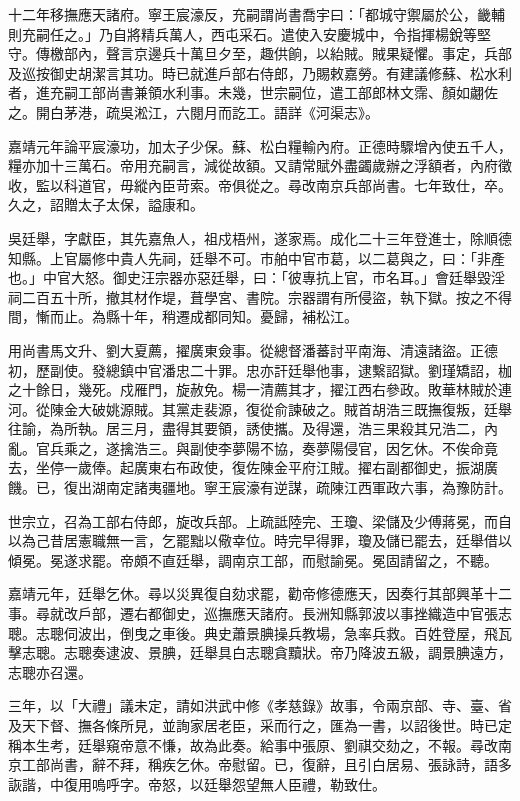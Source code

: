 \begin{pinyinscope}
十二年移撫應天諸府。寧王宸濠反，充嗣謂尚書喬宇曰：「都城守禦屬於公，畿輔則充嗣任之。」乃自將精兵萬人，西屯采石。遣使入安慶城中，令指揮楊銳等堅守。傳檄部內，聲言京邊兵十萬旦夕至，趣供餉，以紿賊。賊果疑懼。事定，兵部及巡按御史胡潔言其功。時已就進戶部右侍郎，乃賜敕嘉勞。有建議修蘇、松水利者，進充嗣工部尚書兼領水利事。未幾，世宗嗣位，遣工部郎林文霈、顏如翽佐之。開白茅港，疏吳淞江，六閱月而訖工。語詳《河渠志》。

嘉靖元年論平宸濠功，加太子少保。蘇、松白糧輸內府。正德時驟增內使五千人，糧亦加十三萬石。帝用充嗣言，減從故額。又請常賦外盡蠲歲辦之浮額者，內府徵收，監以科道官，毋縱內臣苛索。帝俱從之。尋改南京兵部尚書。七年致仕，卒。久之，詔贈太子太保，謚康和。

吳廷舉，字獻臣，其先嘉魚人，祖戍梧州，遂家焉。成化二十三年登進士，除順德知縣。上官屬修中貴人先祠，廷舉不可。市舶中官市葛，以二葛與之，曰：「非產也。」中官大怒。御史汪宗器亦惡廷舉，曰：「彼專抗上官，市名耳。」會廷舉毀淫祠二百五十所，撤其材作堤，葺學宮、書院。宗器謂有所侵盜，執下獄。按之不得間，慚而止。為縣十年，稍遷成都同知。憂歸，補松江。

用尚書馬文升、劉大夏薦，擢廣東僉事。從總督潘蕃討平南海、清遠諸盜。正德初，歷副使。發總鎮中官潘忠二十罪。忠亦訐廷舉他事，逮繫詔獄。劉瑾矯詔，枷之十餘日，幾死。戍雁門，旋赦免。楊一清薦其才，擢江西右參政。敗華林賊於連河。從陳金大破姚源賊。其黨走裴源，復從俞諫破之。賊首胡浩三既撫復叛，廷舉往諭，為所執。居三月，盡得其要領，誘使攜。及得還，浩三果殺其兄浩二，內亂。官兵乘之，遂擒浩三。與副使李夢陽不協，奏夢陽侵官，因乞休。不俟命竟去，坐停一歲俸。起廣東右布政使，復佐陳金平府江賊。擢右副都御史，振湖廣饑。已，復出湖南定諸夷疆地。寧王宸濠有逆謀，疏陳江西軍政六事，為豫防計。

世宗立，召為工部右侍郎，旋改兵部。上疏詆陸完、王瓊、梁儲及少傅蔣冕，而自以為己昔居憲職無一言，乞罷黜以儆幸位。時完早得罪，瓊及儲已罷去，廷舉借以傾冕。冕遂求罷。帝頗不直廷舉，調南京工部，而慰諭冕。冕固請留之，不聽。

嘉靖元年，廷舉乞休。尋以災異復自劾求罷，勸帝修德應天，因奏行其部興革十二事。尋就改戶部，遷右都御史，巡撫應天諸府。長洲知縣郭波以事挫織造中官張志聰。志聰伺波出，倒曳之車後。典史蕭景腆操兵教場，急率兵救。百姓登屋，飛瓦擊志聰。志聰奏逮波、景腆，廷舉具白志聰貪黷狀。帝乃降波五級，調景腆遠方，志聰亦召還。

三年，以「大禮」議未定，請如洪武中修《孝慈錄》故事，令兩京部、寺、臺、省及天下督、撫各條所見，並詢家居老臣，采而行之，匯為一書，以詔後世。時已定稱本生考，廷舉窺帝意不慊，故為此奏。給事中張原、劉祺交劾之，不報。尋改南京工部尚書，辭不拜，稱疾乞休。帝慰留。已，復辭，且引白居易、張詠詩，語多詼諧，中復用嗚呼字。帝怒，以廷舉怨望無人臣禮，勒致仕。


\end{pinyinscope}
